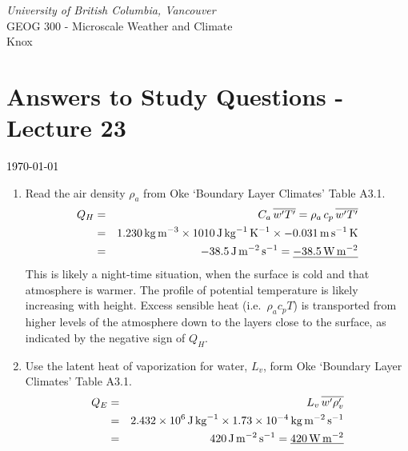 \documentclass[11pt]{article}
\author{Andy Black and Andreas Christen}
\begin{document}
\begin{center}
\emph{University of British Columbia, Vancouver}\\
GEOG 300 - Microscale Weather and Climate\\
Knox
\section*{Answers to Study Questions - Lecture 23}
\textcolor{black}{\today}
\end{center}

\begin{enumerate}

\item Read the air density $\rho_a$ from Oke `Boundary Layer Climates' Table A3.1.
\begin{eqnarray*}
Q_H &=& C_a \, \overline{w^{\prime}T^{\prime}} = \rho_a \, c_p \, \overline{w^{\prime}T^{\prime}} \\
&=& 1.230\,\rm{kg}\,\rm{m}^{-3} \times 1010 \,\rm{J}\,\rm{kg}^{-1}\,\rm{K}^{-1} \times -0.031 \,\rm{m}\,\rm{s}^{-1}\,\rm{K} \\
&=& -38.5 \,\rm{J}\,\rm{m}^{-2}\,\rm{s}^{-1} =  \underline{ -38.5\,\rm{W}\,\rm{m}^{-2}}
\end{eqnarray*}
This is likely a night-time situation, when the surface is cold and that atmosphere is warmer. The profile of potential temperature is likely increasing with height. Excess sensible heat (i.e.\ $\rho_a c_p T$) is transported from higher levels of the atmosphere down to the layers close to the surface, as indicated by the negative sign of $Q_H$. 

\item Use the latent heat of vaporization for water, $L_v$, form Oke `Boundary Layer Climates' Table A3.1.
\begin{eqnarray*}
Q_E &=& L_v \, \overline{w^{\prime}\rho_v^{\prime}} \\
&=& 2.432 \times 10^{6} \,\rm{J}\,\rm{kg}^{-1} \times 1.73 \times 10^{-4}\, \rm{kg}\,\rm{m}^{-2}\,\rm{s}^{-1} \\
&=& 420 \,\rm{J}\,\rm{m}^{-2}\,\rm{s}^{-1} =  \underline{420\,\rm{W}\,\rm{m}^{-2}}
\end{eqnarray*}


\end{enumerate}
\end{document}

